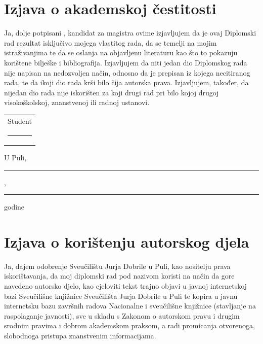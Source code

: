
\section*{Izjava o akademskoj čestitosti}
\thispagestyle{empty}

\vspace{2em}

Ja, dolje potpisani \radAutor, kandidat za magistra \radTitulaOd{} ovime
izjavljujem da je ovaj Diplomski rad rezultat isključivo mojega vlastitog rada,
da se temelji na mojim istraživanjima te da se oslanja na objavljenu literaturu
kao što to pokazuju korištene bilješke i bibliografija. Izjavljujem da niti
jedan dio Diplomskog rada nije napisan na nedozvoljen način, odnosno da je
prepisan iz kojega necitiranog rada, te da ikoji dio rada krši bilo čija
autorska prava. Izjavljujem, također, da nijedan dio rada nije iskorišten za
koji drugi rad pri bilo kojoj drugoj visokoškolskoj, znanstvenoj ili radnoj
ustanovi.

\vspace{5em}
\begin{flushright}
\begin{tabular}{c}
Student \\[2.5em]
\rule{6cm}{0.4pt}
\end{tabular}
\end{flushright}

\vspace{3em}
\noindent U Puli, \rule{3cm}{0.4pt}, \rule{2cm}{0.4pt} godine

\clearpage

\section*{Izjava o korištenju autorskog djela}
\thispagestyle{empty}

\vspace{2em}

Ja, \radAutor{} dajem odobrenje Sveučilištu Jurja Dobrile u Puli, kao nositelju
prava iskorištavanja, da moj diplomski rad pod nazivom \emph{\radNaslov}
koristi na način da gore navedeno autorsko djelo, kao cjeloviti tekst trajno
objavi u javnoj internetskoj bazi Sveučilišne knjižnice Sveučilišta Jurja
Dobrile u Puli te kopira u javnu internetsku bazu završnih radova Nacionalne i
sveučilišne knjižnice (stavljanje na raspolaganje javnosti), sve u skladu s
Zakonom o autorskom pravu i drugim srodnim pravima i dobrom akademskom praksom,
a radi promicanja otvorenoga, slobodnoga pristupa znanstvenim informacijama.

